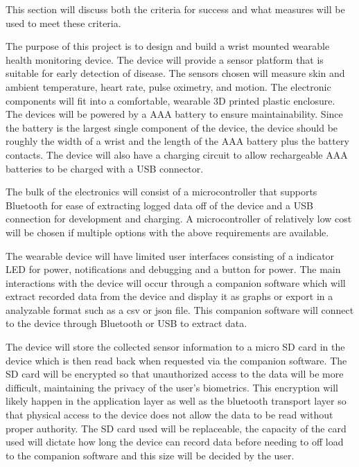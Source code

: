 This section will discuss both the criteria for success and what measures will be used
to meet these criteria.

The purpose of this project is to design and build a wrist mounted wearable
health monitoring device.  The device will provide a sensor platform that is
suitable for early detection of disease.  The sensors chosen will measure skin
and ambient temperature, heart rate, pulse oximetry, and motion.  The electronic
components will fit into a comfortable, wearable 3D printed plastic enclosure.
The devices will be powered by a AAA battery to ensure maintainability.  Since
the battery is the largest single component of the device, the device should be
roughly the width of a wrist and
the length of the AAA battery plus the battery contacts.  The device will also
have a charging circuit to allow rechargeable AAA batteries to be charged with
a USB connector.

The bulk of the electronics will consist of a microcontroller that supports
Bluetooth for ease of extracting logged data off of the device and a USB
connection for development and charging.  A microcontroller of relatively low
cost will be chosen if multiple options with the above requirements are
available.


The wearable device will have limited user interfaces consisting of a indicator
LED for power, notifications and debugging and a button for power.
The main interactions with the device will occur through a companion software
which will extract recorded data from the device and display it as graphs or
export in a analyzable format such as a csv or json file.  This companion
software will connect to the device through Bluetooth or USB to extract data.

The device will store the collected sensor information to a micro SD card
in the device which is then read back when requested via the companion software.
The SD card will be encrypted so that unauthorized access to the data will be
more difficult, maintaining the privacy of the user's biometrics. This
encryption will likely happen in the application layer as well as the bluetooth
transport layer so that physical access to the device does not allow the data to
be read without proper authority. 
The SD card used will be replaceable, the capacity of the card used will dictate
how long the device can record data before needing to off load to the companion
software and this size will be decided by the user.


